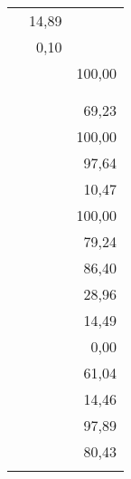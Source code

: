\begin{tabular}{|r|r|r|}
	               &  14,89 &              \\
	               &   0,10 &              \\
	               &        &       100,00 \\
	               &        &              \\
	               &        &              \\
	               &        &        69,23 \\
	               &        &       100,00 \\
	               &        &        97,64 \\
	               &        &        10,47 \\
	               &        &       100,00 \\
	               &        &        79,24 \\
	               &        &        86,40 \\
	               &        &        28,96 \\
	               &        &        14,49 \\
	               &        &         0,00 \\
	               &        &        61,04 \\
	               &        &        14,46 \\
	               &        &        97,89 \\
	               &        &        80,43 \\
	\cmidrule{3-3} &        &
\end{tabular}%
